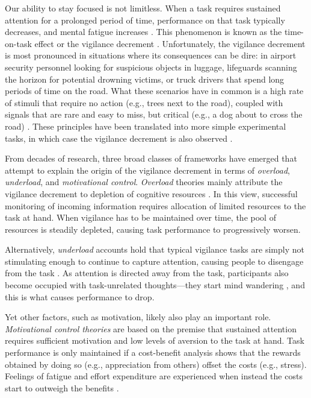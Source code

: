 \documentclass[11pt,]{memoir}
\begin{document}
Our ability to stay focused is not limitless. When a task requires sustained attention for a prolonged period of time, performance on that task typically decreases, and mental fatigue increases \autocite{Ackerman2011}. This phenomenon is known as the time-on-task effect or the vigilance decrement \autocite{Warm2008}. Unfortunately, the vigilance decrement is most pronounced in situations where its consequences can be dire: in airport security personnel looking for suspicious objects in luggage, lifeguards scanning the horizon for potential drowning victims, or truck drivers that spend long periods of time on the road. What these scenarios have in common is a high rate of stimuli that require no action (e.g., trees next to the road), coupled with signals that are rare and easy to miss, but critical (e.g., a dog about to cross the road) \autocite{Parasuraman1979}. These principles have been translated into more simple experimental tasks, in which case the vigilance decrement is also observed \autocites{Bartlett1943}{Mackworth1948}.

From decades of research, three broad classes of frameworks have emerged that attempt to explain the origin of the vigilance decrement in terms of \emph{overload}, \emph{underload}, and \emph{motivational control}. \emph{Overload} theories mainly attribute the vigilance decrement to depletion of cognitive resources \autocite{Helton2008}. In this view, successful monitoring of incoming information requires allocation of limited resources to the task at hand. When vigilance has to be maintained over time, the pool of resources is steadily depleted, causing task performance to progressively worsen.

Alternatively, \emph{underload} accounts hold that typical vigilance tasks are simply not stimulating enough to continue to capture attention, causing people to disengage from the task \autocites{Manly1999}{Robertson1997}. As attention is directed away from the task, participants also become occupied with task-unrelated thoughts---they start mind wandering \autocite{Smallwood2006}, and this is what causes performance to drop.

Yet other factors, such as motivation, likely also play an important role. \emph{Motivational control theories} \autocite{Hockey1997} are based on the premise that sustained attention requires sufficient motivation and low levels of aversion to the task at hand. Task performance is only maintained if a cost-benefit analysis shows that the rewards obtained by doing so (e.g., appreciation from others) offset the costs (e.g., stress). Feelings of fatigue and effort expenditure are experienced when instead the costs start to outweigh the benefits \autocite{Kurzban2013}.
\end{document}
